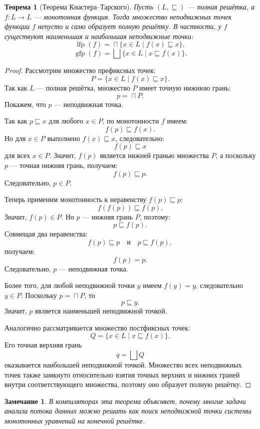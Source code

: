 \documentclass[12pt,a4paper]{article}
\DeclareMathOperator*{\bigsqcap}{\sqcap}
\newtheorem{theorem}{Теорема}
\newtheorem{remark}{Замечание}
\begin{document}
\begin{theorem}[Теорема Кнастера--Тарского]
Пусть $(L,\sqsubseteq)$ --- полная решётка, а $f:L\to L$ --- монотонная функция. Тогда множество неподвижных точек функции $f$ непусто и само образует полную решётку. В частности, у $f$ существуют наименьшая и наибольшая неподвижные точки:
\[
\operatorname{lfp}(f)=\bigsqcap \{x\in L \mid f(x)\sqsubseteq x\},
\]
\[
\operatorname{gfp}(f)=\bigsqcup \{x\in L \mid x\sqsubseteq f(x)\}.
\]
\end{theorem}

\begin{proof}
Рассмотрим множество префиксных точек:
\[
P=\{x\in L \mid f(x)\sqsubseteq x\}.
\]
Так как $L$ --- полная решётка, множество $P$ имеет точную нижнюю грань:
\[
p=\bigsqcap P.
\]
Покажем, что $p$ --- неподвижная точка.

Так как $p \sqsubseteq x$ для любого $x\in P$, по монотонности $f$ имеем:
\[
f(p)\sqsubseteq f(x).
\]
Но для $x\in P$ выполнено $f(x)\sqsubseteq x$, следовательно:
\[
f(p)\sqsubseteq x
\]
для всех $x\in P$. Значит, $f(p)$ является нижней гранью множества $P$, а поскольку $p$ --- точная нижняя грань, получаем:
\[
f(p)\sqsubseteq p.
\]
Следовательно, $p\in P$.

Теперь применим монотонность к неравенству $f(p)\sqsubseteq p$:
\[
f(f(p))\sqsubseteq f(p).
\]
Значит, $f(p)\in P$. Но $p$ --- нижняя грань $P$, поэтому:
\[
p\sqsubseteq f(p).
\]
Совмещая два неравенства:
\[
f(p)\sqsubseteq p
\quad \text{и} \quad
p\sqsubseteq f(p),
\]
получаем:
\[
f(p)=p.
\]
Следовательно, $p$ --- неподвижная точка.

Более того, для любой неподвижной точки $y$ имеем $f(y)=y$, следовательно $y\in P$. Поскольку $p=\bigsqcap P$, то
\[
p\sqsubseteq y.
\]
Значит, $p$ является наименьшей неподвижной точкой.

Аналогично рассматривается множество постфиксных точек:
\[
Q=\{x\in L \mid x\sqsubseteq f(x)\}.
\]
Его точная верхняя грань
\[
q=\bigsqcup Q
\]
оказывается наибольшей неподвижной точкой. Множество всех неподвижных точек также замкнуто относительно взятия точных верхних и нижних граней внутри соответствующего множества, поэтому оно образует полную решётку.
\end{proof}

\begin{remark}
В компиляторах эта теорема объясняет, почему многие задачи анализа потока данных можно решать как поиск неподвижной точки системы монотонных уравнений на конечной решётке.
\end{remark}
\end{document}
